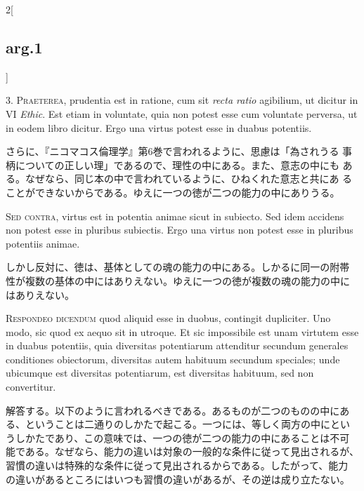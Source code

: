 \documentclass[paper=a4paper,fontsize=10pt,jafontsize=9pt,titlepage]{jlreq}
\begin{document}
\begin{paracol}{2}[\subsection{arg.1}]

3. {\scshape Praeterea}, prudentia est in ratione, cum sit {\itshape
recta ratio} agibilium, ut dicitur in VI {\itshape Ethic}. Est etiam
in voluntate, quia non potest esse cum voluntate perversa, ut in eodem
libro dicitur. Ergo una virtus potest esse in duabus potentiis.

\switchcolumn

さらに、『ニコマコス倫理学』第6巻で言われるように、思慮は「為されうる
事柄についての正しい理」であるので、理性の中にある。また、意志の中にも
ある。なぜなら、同じ本の中で言われているように、ひねくれた意志と共にあ
ることができないからである。ゆえに一つの徳が二つの能力の中にありうる。

\switchcolumn*[\subsection{s.c.}]

{\scshape Sed contra}, virtus est in potentia animae sicut in
subiecto. Sed idem accidens non potest esse in pluribus
subiectis. Ergo una virtus non potest esse in pluribus potentiis
animae.

\switchcolumn

しかし反対に、徳は、基体としての魂の能力の中にある。しかるに同一の附帯
性が複数の基体の中にはありえない。ゆえに一つの徳が複数の魂の能力の中に
はありえない。


{\scshape Respondeo dicendum} quod aliquid esse in duobus, contingit
dupliciter. Uno modo, sic quod ex aequo sit in utroque. Et sic
impossibile est unam virtutem esse in duabus potentiis, quia
diversitas potentiarum attenditur secundum generales conditiones
obiectorum, diversitas autem habituum secundum speciales; unde
ubicumque est diversitas potentiarum, est diversitas habituum, sed non
convertitur.

\switchcolumn

解答する。以下のように言われるべきである。あるものが二つのものの中にあ
る、ということは二通りのしかたで起こる。一つには、等しく両方の中にとい
うしかたであり、この意味では、一つの徳が二つの能力の中にあることは不可
能である。なぜなら、能力の違いは対象の一般的な条件に従って見出されるが、
習慣の違いは特殊的な条件に従って見出されるからである。したがって、能力
の違いがあるところにはいつも習慣の違いがあるが、その逆は成り立たない。


\end{paracol}
\end{document}
